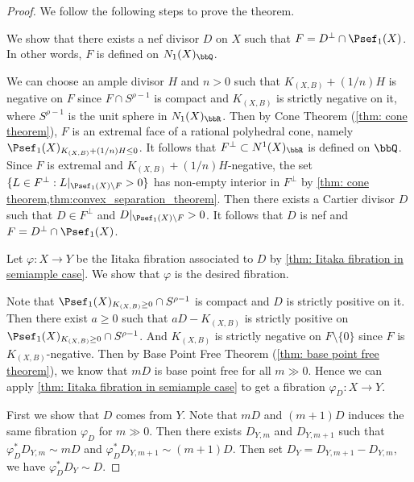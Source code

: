     \begin{proof}
        We follow the following steps to prove the theorem.
        \begin{step}\label{step:K_negative_face_is_rational_in_thm:contraction_theorem}
            We show that there exists a nef divisor \(D\) on \(X\) such that \(F = D^\perp \cap \Psef_1(X)\).
            In other words, \(F\) is defined on \(N_1(X)_\bbQ\).
        \end{step}
        We can choose an ample divisor \(H\) and \(n > 0\) such that \(K_{(X,B)}+(1/n)H\) is negative on \(F\) since \(F \cap S^{\rho-1}\) is compact and \(K_{(X,B)}\) is strictly negative on it,
        where \(S^{\rho-1}\) is the unit sphere in \(N_1(X)_\bbR\).
        Then by Cone Theorem (\cref{thm: cone theorem}), \(F\) is an extremal face of a rational polyhedral cone, namely \(\Psef_1(X)_{K_{(X,B)}+(1/n) H \leq 0}\).
        It follows that \(F^\perp \subset N^1(X)_\bbR\) is defined on \(\bbQ\).
        Since \(F\) is extremal and \(K_{(X,B)}+(1/n)H\)-negative, the set \(\{L \in F^\perp: L|_{\Psef_1(X)\setminus F}>0\}\) has non-empty interior in \(F^\perp\) by \cref{thm: cone theorem,thm:convex_separation_theorem}.
        Then there exists a Cartier divisor \(D\) such that \(D \in F^\perp\) and \(D|_{\Psef_1(X)\setminus F} > 0\).
        It follows that \(D\) is nef and \(F = D^\perp \cap \Psef_1(X)\).

        \begin{step}
            Let \(\varphi: X \to Y\) be the Iitaka fibration associated to \(D\) by \cref{thm: Iitaka fibration in semiample case}.
            We show that \(\varphi\) is the desired fibration.
        \end{step}
        Note that \(\Psef_1(X)_{K_{(X,B)} \geq 0} \cap S^{\rho-1}\) is compact and \(D\) is strictly positive on it.
        Then there exist \(a \geq 0\) such that \(aD - K_{(X,B)}\) is strictly positive on \(\Psef_1(X)_{K_{(X,B)} \geq 0} \cap S^{\rho-1}\).
        And \(K_{(X,B)}\) is strictly negative on \(F\setminus \{0\}\) since \(F\) is \(K_{(X,B)}\)-negative.
        Then by Base Point Free Theorem (\cref{thm: base point free theorem}), we know that \(mD\) is base point free for all \(m \gg 0\).
        Hence we can apply \cref{thm: Iitaka fibration in semiample case} to get a fibration \(\varphi_D: X \to Y\).

        First we show that \(D\) comes from \(Y\).
        Note that \(mD\) and \((m+1)D\) induces the same fibration \(\varphi_D\) for \(m \gg 0\).
        Then there exists \(D_{Y,m}\) and \(D_{Y,m+1}\) such that \(\varphi_D^* D_{Y,m} \sim mD\) and \(\varphi_D^* D_{Y,m+1} \sim (m+1)D\).
        Then set \(D_Y = D_{Y,m+1} - D_{Y,m}\), we have \(\varphi_D^* D_Y \sim D\).


\end{proof}
